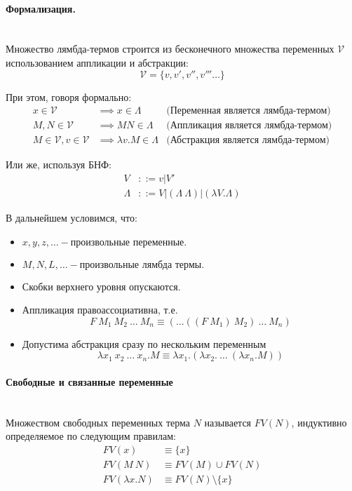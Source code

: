 \documentclass[lambda.tex]{subfiles}
\begin{document}
\paragraph{Формализация.}~\\

Множество лямбда-термов строится из бесконечного множества переменных $\mathcal{V}$ использованием аппликации и абстракции:
\[\mathcal{V} = \{ v, v', v'', v''' \dots \}\]

При этом, говоря формально:
\begin{align*}
x \in \mathcal{V} & \implies x \in \Lambda & \text{(Переменная является лямбда-термом)}\\
M, N \in \mathcal{V} & \implies M N \in \Lambda & \text{(Аппликация является лямбда-термом)}\\
M \in \mathcal{V}, v \in \mathcal{V} & \implies \lambda v.M \in \Lambda & \text{(Абстракция является лямбда-термом)}
\end{align*}

Или же, используя БНФ:
\begin{align*}
V &::= v|V'\\
\Lambda &::= V | (\Lambda\ \Lambda) | ( \lambda V . \Lambda )
\end{align*}

В дальнейшем условимся, что:
\begin{itemize}
\item\(x,y,z,\dots - \text{произвольные переменные.}\)
\item\(M,N,L,\dots - \text{произвольные лямбда термы.}\)
\item Скобки верхнего уровня опускаются.
\item Аппликация правоассоциативна, т.е.\\
\[F\ M_1 \ M_2 \ \dots\ M_n \equiv (\dots((F\ M_1)\ M_2)\ \dots\ M_n)\]
\item Допустима абстракция сразу по нескольким переменным
\[\lambda x_1 \ x_2 \ \dots\ x_n .M \equiv \lambda x_1 .(\lambda x_2 .\ \dots\ (\lambda x_n .M))\]
\end{itemize}

\paragraph{Свободные и связанные переменные} %
\label{par:free_and_bound} ~\\
Множеством свободных переменных терма $N$ называется $FV(N)$, индуктивно определяемое по следующим правилам:
\begin{align*}
FV(x) &\equiv \{x\}\\
FV(M\ N) &\equiv FV(M)\cup FV(N)\\
FV(\lambda x.N) &\equiv FV(N)\setminus\{x\}
\end{align*}
\end{document}
